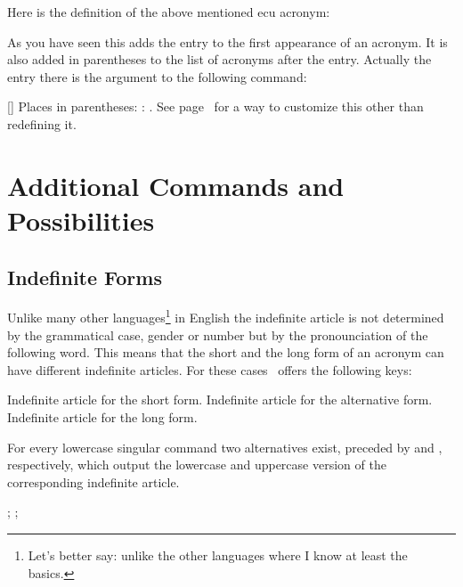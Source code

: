 \documentclass{acro-manual}
\begin{document}
Here is the definition of the above mentioned \ac{ecu} acronym:
\begin{sourcecode}
\end{sourcecode}
As you have seen this adds the  entry to the first
appearance of an acronym.  It is also added in parentheses to the list of
acronyms after the  entry.  Actually the entry there is the
argument to the following command:
\begin{commands}
  []
    Places  in parentheses: :
    .  See page~\pageref{key:list-foreign-format} for a
    way to customize this other than redefining it.
\end{commands}

\section{Additional Commands and Possibilities}
\subsection{Indefinite Forms}

Unlike many other languages\footnote{Let's better say: unlike the other
  languages where I know at least the basics.} in English the indefinite
article is not determined by the grammatical case, gender or number but by the
pronounciation of the following word.  This means that the short and the long
form of an acronym can have different indefinite articles.  For these cases
\acro\ offers the following keys:
\begin{properties}
    Indefinite article for the short form.
    Indefinite article for the alternative form.
    Indefinite article for the long form.
\end{properties}
For every lowercase singular command two alternatives exist, preceded by
 and , respectively, which output the lowercase and uppercase
version of the corresponding indefinite article.

\begin{example}
  ; ; 
\end{example}
\end{document}
